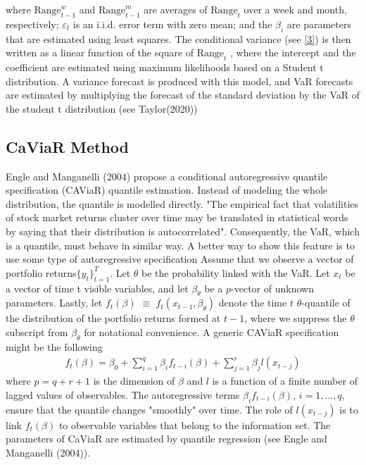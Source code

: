 \documentclass[a4paper,11pt,oneside]{book}
\begin{document}
where  $\text{Range}^{w}_{t-1}$
and $\text{Range}^{m}_{t-1}$ are
averages of $\text{Range}_{t}$ over a week and month, respectively;
$\varepsilon_t$
is an i.i.d. error term with zero mean; and the $\beta_{i}$
are parameters that are estimated using least squares.
The conditional variance (see \autoref{3})  is then written as a linear
function of the square of $\text{Range}_{t}$
, where the intercept and
the coefficient are estimated using maximum likelihoods
based on a Student t distribution. A variance forecast is produced with this model, and VaR forecasts are estimated by multiplying the forecast of the standard deviation by the VaR of the student t distribution (see Taylor(2020))


\subsection{CaViaR Method}
Engle and Manganelli (2004) propose a conditional autoregressive quantile specification (CAViaR) quantile estimation. Instead of modeling the whole distribution, the quantile is modelled directly. "The empirical fact that volatilities of stock market returns cluster over time may be translated in statistical words by saying that their distribution is autocorrelated". Consequently, the VaR, which is a quantile, must behave in similar way. A better way to show this feature is to use some type of autoregressive specification
\newline\newline
 Assume that we observe a vector of portfolio returns$\{y_t\}^T_{t=1}$. Let $\theta$ be the probability linked with the VaR. Let $x_t$ be a vector of time t visible variables, and let  ${\beta}_\theta$ be a $p$-vector of unknown parameters. Lastly, let $f_t(\beta) $ $\equiv$ $ f_t(x_{t-1},{\beta}_\theta)$ denote the time $t$ $\theta$-quantile of the distribution of the portfolio returns formed at $t-1$, where we suppress the $\theta$ subscript from $\beta_\theta$ for notational convenience. A generic CAViaR specification might be the following  
\begin{equation}
\begin{aligned}
f_t(\beta)=\beta_0 + \sum_{i=1}^{q} \beta_{i}f _{t-i}(\beta) +\sum_{j=1}^{r}\beta_{j}l(x_{t-j})
\label{5}
\end{aligned}
\end{equation}
where $p=q+r+1$ is the dimension of $\beta$ and $l$ is a function of a finite number of lagged values of observables. The autoregressive terms $\beta_{i}f_{t-i}(\beta)$, $i = 1,...,q$, ensure that the quantile changes "smoothly" over time. The role of $l(x_{t-j})$ is to link $f_{t}(\beta)$ to observable variables that belong to the information set. The parameters of CaViaR are estimated by quantile regression (see Engle and Manganelli (2004)).
\end{document}
